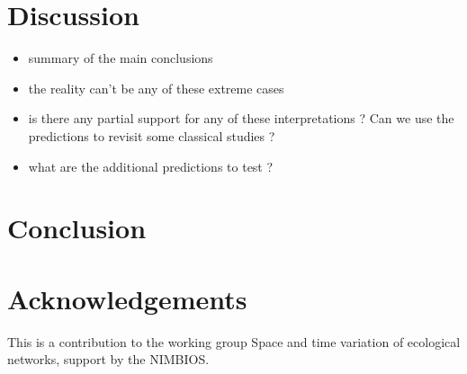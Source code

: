 \documentclass[12pt]{article}
\begin{document}
\section*{Discussion}

\begin{itemize}
\item summary of the main conclusions

\item the reality can't be any of these extreme cases

\item is there any partial support for any of these interpretations ? Can we use the predictions to revisit some classical studies ?  

\item what are the additional predictions to test ? 

\end{itemize}    
\section*{Conclusion}

\section*{Acknowledgements} 

This is a contribution to the working group Space and time variation of ecological networks, support by the NIMBIOS. 

\newpage


%

\end{document}
